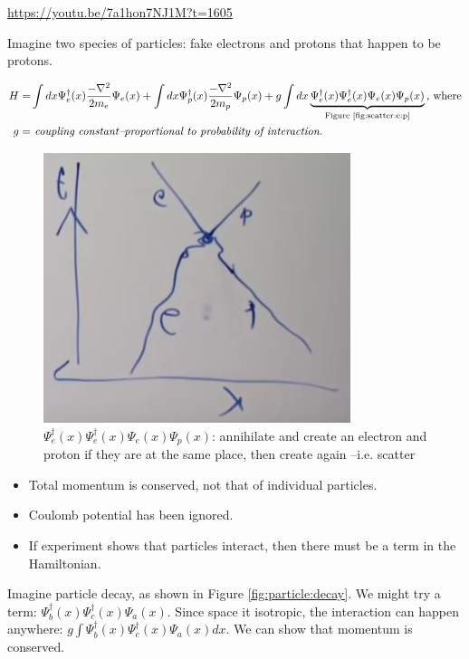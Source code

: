 \documentclass[]{article}
\begin{document}
\url{https://youtu.be/7a1hon7NJ1M?t=1605}

Imagine two species of particles: fake electrons and protons that happen to be protons.

\begin{align*}
H =& \int dx  \Psi^\dagger_e(x) \frac{- \nabla^2}{2m_e} \Psi_e(x) + \int dx \Psi^\dagger_p(x) \frac{- \nabla^2}{2m_p} \Psi_p(x)  + g \int dx \underbrace{\Psi^\dagger_e(x) \Psi^\dagger_e(x) \Psi_e(x) \Psi_p(x)}_\text{Figure \ref{fig:scatter:e:p}} \text{, where}\\
g=& \textit{ coupling constant--proportional to probability of interaction.}
\end{align*}

\begin{figure}[H]
	\caption[$\Psi^\dagger_e(x) \Psi^\dagger_e(x) \Psi_e(x) \Psi_p(x)$--scattering]{$\Psi^\dagger_e(x) \Psi^\dagger_e(x) \Psi_e(x) \Psi_p(x)$: annihilate and create an electron and proton if they are at the same place, then create again --i.e. scatter}\label{fig:scatter:e:p}
	\includegraphics[width=0.8\textwidth]{scatter_e_p}
\end{figure}

\begin{itemize}
	\item Total momentum is conserved, not that of individual particles.
	\item Coulomb potential has been ignored.
	\item If experiment shows that particles interact, then there must be a term in the Hamiltonian.
\end{itemize}

Imagine particle decay, as shown in Figure \ref{fig:particle:decay}. We might try a term: $\Psi^\dagger_b(x) \Psi^\dagger_c(x) \Psi_a(x)$. Since space it isotropic, the interaction can happen anywhere: $g \int \Psi^\dagger_b(x) \Psi^\dagger_c(x) \Psi_a(x) dx$. We can show that momentum is conserved.
\end{document}
